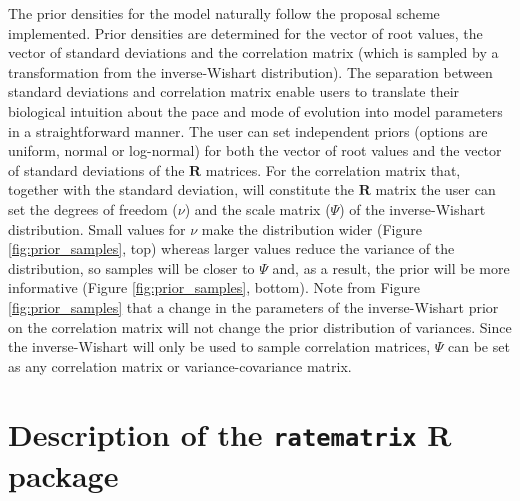 The prior densities for the model naturally follow the proposal scheme implemented. Prior densities are determined for the vector of root values, the vector of standard deviations and the correlation matrix (which is sampled by a transformation from the inverse-Wishart distribution). The separation between standard deviations and correlation matrix enable users to translate their biological intuition about the pace and mode of evolution into model parameters in a straightforward manner. The user can set independent priors (options are uniform, normal or log-normal) for both the vector of root values and the vector of standard deviations of the $\mathbf{R}$ matrices. For the correlation matrix that, together with the standard deviation, will constitute the $\mathbf{R}$ matrix the user can set the degrees of freedom ($\nu$) and the scale matrix ($\Psi$) of the inverse-Wishart distribution. Small values for $\nu$ make the distribution wider (Figure \ref{fig:prior_samples}, top) whereas larger values reduce the variance of the distribution, so samples will be closer to $\Psi$ and, as a result, the prior will be more informative (Figure \ref{fig:prior_samples}, bottom). Note from Figure \ref{fig:prior_samples} that a change in the parameters of the inverse-Wishart prior on the correlation matrix will not change the prior distribution of variances. Since the inverse-Wishart will only be used to sample correlation matrices, $\Psi$ can be set as any correlation matrix or variance-covariance matrix.

\section{ Description of the \texttt{ratematrix} R package }

